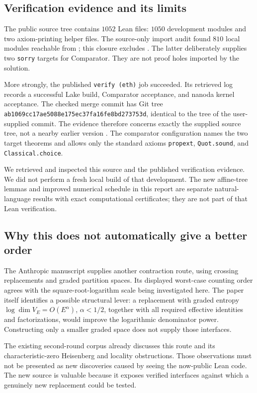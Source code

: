 \subsection{Verification evidence and its limits}
The public source tree contains $1052$ Lean files: $1050$ development
modules and two axiom-printing helper files. The source-only import audit
found $810$ local modules reachable from ; this closure
excludes . The latter deliberately supplies two
\texttt{sorry} targets for Comparator. They are not proof holes imported
by the solution.

More strongly, the published \texttt{verify (eth)} job succeeded. Its
retrieved log records a successful Lake build, Comparator acceptance, and
nanoda kernel acceptance. The checked merge commit has Git tree
\texttt{ab1069cc17ae5088e175ec37fa16fe8bd273753d}, identical to the
tree of the user-supplied commit. The evidence therefore concerns exactly
the supplied source tree, not a nearby earlier version \cite{anthci}.
The comparator configuration names the two target theorems and allows
only the standard axioms \texttt{propext}, \texttt{Quot.sound}, and
\texttt{Classical.choice}.

We retrieved and inspected this source and the published verification
evidence. We did not perform a fresh local build of that development.
The new affine-tree lemmas and improved numerical schedule in this report
are separate natural-language results with exact computational certificates;
they are not part of that Lean verification.

\subsection{Why this does not automatically give a better order}
The Anthropic manuscript supplies another contraction route, using
crossing replacements and graded partition spaces. Its displayed
worst-case counting order agrees with the square-root-logarithm scale
being investigated here. The paper itself identifies a possible structural
lever: a replacement with graded entropy $\log\dim V_E=O(E^\alpha)$,
$\alpha<1/2$, together with all required effective identities and
factorizations, would improve the logarithmic denominator power.
Constructing only a smaller graded space does not supply those interfaces.

The existing second-round corpus already discusses this route and its
characteristic-zero Heisenberg and locality obstructions. Those observations
must not be presented as new discoveries caused by seeing the now-public
Lean code. The new source is valuable because it exposes verified interfaces
against which a genuinely new replacement could be tested.

